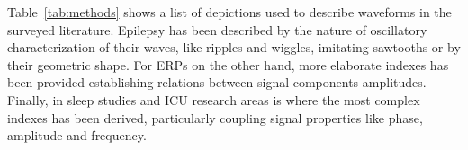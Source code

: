 \documentclass[brainsci,article,submit,moreauthors,pdftex,10pt,a4paper]{mdpi}
\begin{document}
Table~\ref{tab:methods} shows a list of depictions used to describe waveforms in the surveyed literature.  Epilepsy has been described by the nature of oscillatory characterization of their waves, like ripples and wiggles, imitating sawtooths or by their geometric shape.  For ERPs on the other hand, more elaborate indexes has been provided establishing relations between signal components amplitudes.  Finally, in sleep studies and ICU research areas is where the most complex indexes has been derived, particularly coupling signal properties like phase, amplitude and frequency.



%
%



\end{document}
